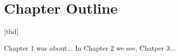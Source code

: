 





\section{Chapter Outline}

[tbd]


Chapter 1 was about...
In Chapter 2 we see,
Chatper 3...













